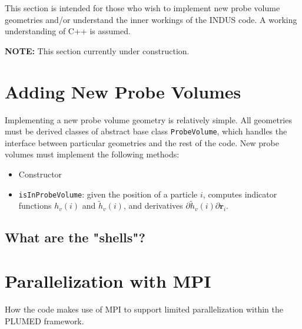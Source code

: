 \documentclass[11pt,notitlepage]{article}
\begin{document}
This section is intended for those who wish to implement new probe volume geometries and/or understand the inner workings of the INDUS code. A working understanding of C++ is assumed. 

\textbf{NOTE:} This section currently under construction.


\section{Adding New Probe Volumes}

Implementing a new probe volume geometry is relatively simple. All geometries must be derived classes of abstract base class \texttt{ProbeVolume}, which handles the interface between particular geometries and the rest of the code. New probe volumes must implement the following methods:

\begin{itemize}
	\item Constructor
	\item \texttt{isInProbeVolume}: given the position of a particle $i$, computes indicator functions $h_v(i)$ and $\tilde{h}_v(i)$, and derivatives $\partial \tilde{h}_v(i) \partial \mathbf{r}_i$.
\end{itemize}


\subsection{What are the "shells"?}


\section{Parallelization with MPI}

How the code makes use of MPI to support limited parallelization within the PLUMED framework.








\end{document}
